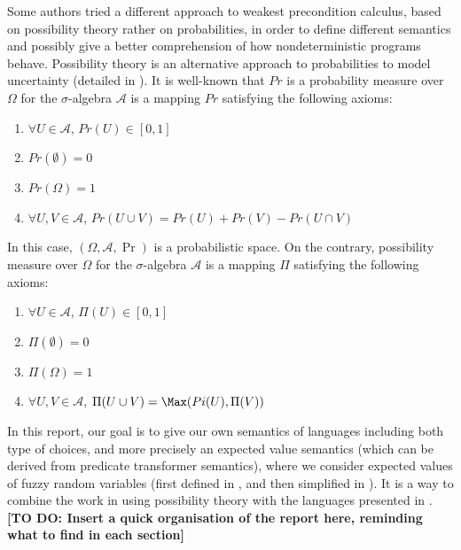 \documentclass[a4paper,10pt]{llncs}
\newcommand\todo[1]{{\color{red}\textbf{[TO DO:  #1]}}}
\begin{document}
Some authors \cite{WuChen08,WuChen11,WuChen12} tried a different approach to weakest precondition calculus, based on possibility theory rather on probabilities, in order to define different semantics and possibly give a better comprehension of how nondeterministic programs behave.
Possibility theory is an alternative approach to probabilities to model uncertainty (detailed in \cite{Agarwal15,Shapiro09}). It is well-known that $Pr$ is a probability measure over $\Omega$ for the $\sigma$-algebra $\mathcal{A}$ is a mapping $Pr$ satisfying the following axioms:
\begin{enumerate}
\item $\forall U \in \mathcal{A}$, $Pr(U) \in [0,1]$
\item $Pr(\emptyset) = 0$
\item $Pr(\Omega) = 1$
\item $\forall U,V \in \mathcal{A}$, $Pr(U \cup V) = Pr(U) + Pr(V) - Pr(U \cap V)$
\end{enumerate}
In this case, $(\Omega,\mathcal{A},\Pr)$ is a probabilistic space.\newline
On the contrary, possibility measure over $\Omega$ for the $\sigma$-algebra $\mathcal{A}$ is a mapping $\Pi$ satisfying the following axioms:
\begin{enumerate}
\item $\forall U \in \mathcal{A}$, $\Pi(U) \in [0,1]$
\item $\Pi(\emptyset) = 0$
\item $\Pi(\Omega) = 1$
\item $\forall U,V \in \mathcal{A}$, $\Pi(U \cup V) = \Max( Pi(U), \Pi(V))$
\end{enumerate}


In this report, our goal is to give our own semantics of languages including both type of choices, and more precisely an expected value semantics (which can be derived from predicate transformer semantics), where we consider expected values of fuzzy random variables (first defined in \cite{PuriRal86}, and then simplified in \cite{Shapiro09}). It is a way to combine the work in \cite{WuChen08,WuChen11,WuChen12} using possibility theory with the languages presented in \cite{McIver05}.\newline
\todo{Insert a quick organisation of the report here, reminding what to find in each section}
\end{document}
